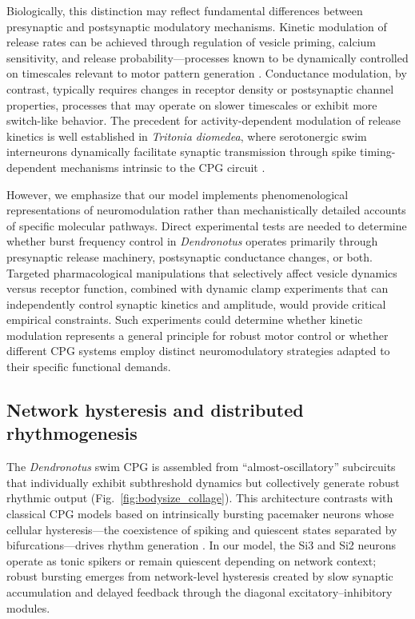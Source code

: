 \documentclass[nofootinbib,aip,amsmath,amssymb,preprint,twocolumn,floatfix,10pt]{revtex4-2}
\begin{document}
Biologically, this distinction may reflect fundamental differences between presynaptic and postsynaptic modulatory mechanisms. Kinetic modulation of release rates can be achieved through regulation of vesicle priming, calcium sensitivity, and release probability---processes known to be dynamically controlled on timescales relevant to motor pattern generation \cite{NeherBrose2018, jackman2017mechanisms}. Conductance modulation, by contrast, typically requires changes in receptor density or postsynaptic channel properties, processes that may operate on slower timescales or exhibit more switch-like behavior. The precedent for activity-dependent modulation of release kinetics is well established in \textit{Tritonia diomedea}, where serotonergic swim interneurons dynamically facilitate synaptic transmission through spike timing-dependent mechanisms intrinsic to the CPG circuit \cite{katz1994dynamic, sakurai2003spike}.

However, we emphasize that our model implements phenomenological representations of neuromodulation rather than mechanistically detailed accounts of specific molecular pathways. Direct experimental tests are needed to determine whether burst frequency control in \textit{Dendronotus} operates primarily through presynaptic release machinery, postsynaptic conductance changes, or both. Targeted pharmacological manipulations that selectively affect vesicle dynamics versus receptor function, combined with dynamic clamp experiments that can independently control synaptic kinetics and amplitude, would provide critical empirical constraints. Such experiments could determine whether kinetic modulation represents a general principle for robust motor control or whether different CPG systems employ distinct neuromodulatory strategies adapted to their specific functional demands.

\subsection{Network hysteresis and distributed rhythmogenesis}

The \textit{Dendronotus} swim CPG is assembled from ``almost-oscillatory'' subcircuits that individually exhibit subthreshold dynamics but collectively generate robust rhythmic output (Fig.~\ref{fig:bodysize_collage}). This architecture contrasts with classical CPG models based on intrinsically bursting pacemaker neurons whose cellular hysteresis---the coexistence of spiking and quiescent states separated by bifurcations---drives rhythm generation \cite{plant81, Rinzel87b, RL87}. In our model, the Si3 and Si2 neurons operate as tonic spikers or remain quiescent depending on network context; robust bursting emerges from network-level hysteresis created by slow synaptic accumulation and delayed feedback through the diagonal excitatory--inhibitory modules.
\end{document}
